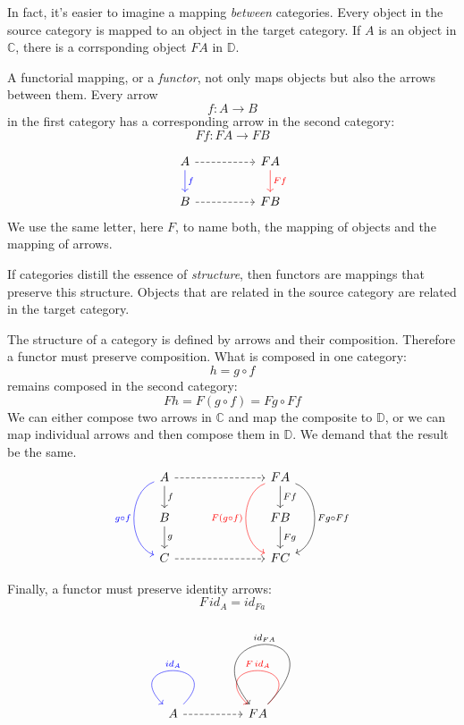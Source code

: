\documentclass[DaoFP]{subfiles}
\begin{document}
In fact, it's easier to imagine a mapping \emph{between} categories. Every object in the source category is mapped to an object in the target category. If $A$ is an object in $\mathbb{C}$, there is a corrsponding object $F A$ in $\mathbb{D}$.

A functorial mapping, or a \emph{functor}, not only maps objects but also the arrows between them. Every arrow 
\[ f \colon A \to B\]
in the first category has a corresponding arrow in the second category:
\[ F f \colon F A \to F B\]


\[
 \begin{tikzcd}
 A 
 \arrow[d, blue, "f"]
\arrow[rr, dashed]
 && F A
  \arrow[d, red, "F f"]
 \\
 B 
 \arrow[rr, dashed]
&& F B
  \end{tikzcd}
\]
We use the same letter, here $F$, to name both, the mapping of objects and the mapping of arrows. 

If categories distill the essence of \emph{structure}, then functors are mappings that preserve this structure. Objects that are related in the source category are related in the target category. 

The structure of a category is defined by arrows and their composition. Therefore a functor must preserve composition. What is composed in one category:
\[ h = g \circ f \]
remains composed in the second category:
\[ F h = F (g \circ f) = F g \circ F f \]
We can either compose two arrows in $\mathbb{C}$ and map the composite to $\mathbb{D}$, or we can map individual arrows and then compose them in $\mathbb{D}$. We demand that the result be the same.
\[
 \begin{tikzcd}
 A 
 \arrow[d, "f"]
\arrow[rrr, dashed]
\arrow[dd, bend right = 70, blue, "g \circ f"']
 &&& F A
  \arrow[d, "F f"]
  \arrow[dd, bend left = 70, "F g \circ F f"]
  \arrow[dd, bend right = 70, red, "F (g \circ f)"']
 \\
 B 
 \arrow[d, "g"]
&&& F B
 \arrow[d, "F g"]
 \\
 C
 \arrow[rrr, dashed]
&&& F C
  \end{tikzcd}
\]

Finally, a functor must preserve identity arrows:
\[ F\, id_A = id_{F a} \]

\[
 \begin{tikzcd}
 A 
  \arrow[loop, blue,  "id_A"']
\arrow[rr, dashed]
 && F A
  \arrow[loop, red, "F \, id_{A}"']
  \arrow[loop, controls={+(2.5, 2.6) and +(-2, 2.5)}, "id_{F A}"']
  \end{tikzcd}
\]
\end{document}
